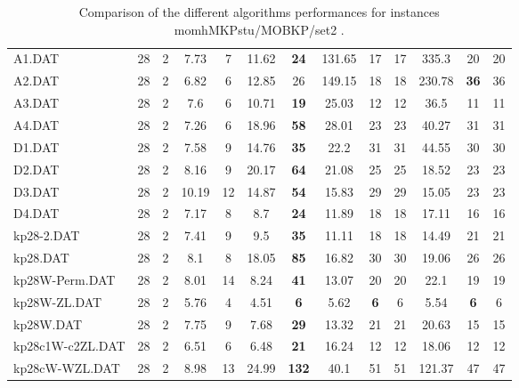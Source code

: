 \begin{table}[h]
{\begin{tabular}{lcccccccccccc}
A1.DAT & 28 & 2 &  \textcolor{blue2}{7.73} & 7 & 11.62 &  \textbf{24} & 131.65 & 17 & 17 & 335.3 & 20 & 20 \\
A2.DAT & 28 & 2 &  \textcolor{blue2}{6.82} & 6 & 12.85 & 26 & 149.15 & 18 & 18 & 230.78 &  \textbf{36} & 36 \\
A3.DAT & 28 & 2 &  \textcolor{blue2}{7.6} & 6 & 10.71 &  \textbf{19} & 25.03 & 12 & 12 & 36.5 & 11 & 11 \\
A4.DAT & 28 & 2 &  \textcolor{blue2}{7.26} & 6 & 18.96 &  \textbf{58} & 28.01 & 23 & 23 & 40.27 & 31 & 31 \\
D1.DAT & 28 & 2 &  \textcolor{blue2}{7.58} & 9 & 14.76 &  \textbf{35} & 22.2 & 31 & 31 & 44.55 & 30 & 30 \\
D2.DAT & 28 & 2 &  \textcolor{blue2}{8.16} & 9 & 20.17 &  \textbf{64} & 21.08 & 25 & 25 & 18.52 & 23 & 23 \\
D3.DAT & 28 & 2 &  \textcolor{blue2}{10.19} & 12 & 14.87 &  \textbf{54} & 15.83 & 29 & 29 & 15.05 & 23 & 23 \\
D4.DAT & 28 & 2 &  \textcolor{blue2}{7.17} & 8 & 8.7 &  \textbf{24} & 11.89 & 18 & 18 & 17.11 & 16 & 16 \\
kp28-2.DAT & 28 & 2 &  \textcolor{blue2}{7.41} & 9 & 9.5 &  \textbf{35} & 11.11 & 18 & 18 & 14.49 & 21 & 21 \\
kp28.DAT & 28 & 2 &  \textcolor{blue2}{8.1} & 8 & 18.05 &  \textbf{85} & 16.82 & 30 & 30 & 19.06 & 26 & 26 \\
kp28W-Perm.DAT & 28 & 2 &  \textcolor{blue2}{8.01} & 14 & 8.24 &  \textbf{41} & 13.07 & 20 & 20 & 22.1 & 19 & 19 \\
kp28W-ZL.DAT & 28 & 2 & 5.76 & 4 &  \textcolor{blue2}{4.51} &  \textbf{6} & 5.62 &  \textbf{6} & 6 & 5.54 &  \textbf{6} & 6 \\
kp28W.DAT & 28 & 2 & 7.75 & 9 &  \textcolor{blue2}{7.68} &  \textbf{29} & 13.32 & 21 & 21 & 20.63 & 15 & 15 \\
kp28c1W-c2ZL.DAT & 28 & 2 & 6.51 & 6 &  \textcolor{blue2}{6.48} &  \textbf{21} & 16.24 & 12 & 12 & 18.06 & 12 & 12 \\
kp28cW-WZL.DAT & 28 & 2 &  \textcolor{blue2}{8.98} & 13 & 24.99 &  \textbf{132} & 40.1 & 51 & 51 & 121.37 & 47 & 47 \\
\bottomrule
\end{tabular}
}%
\caption{Comparison of the different algorithms performances for instances momhMKPstu/MOBKP/set2 .}
\label{tab:table_compare_momhMKPstu/MOBKP/set2 }
\end{table}
